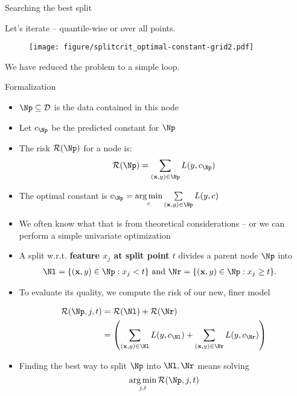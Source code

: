 \documentclass[11pt,compress,t,notes=noshow, xcolor=table]{beamer}
\begin{document}
\begin{vbframe}{Searching the best split}

Let's iterate -- quantile-wise or over all points.
\begin{figure}
\texttt{[image: figure/splitcrit\_optimal-constant-grid2.pdf]} 
\end{figure}

We have reduced the problem to a simple loop.

\end{vbframe}

\begin{vbframe}{Formalization}

\begin{itemize}
\item $\Np \subseteq \D$ is the data contained in this node
\item Let $c_{\Np}$ be the predicted constant for $\Np$ %
\item The risk $\risk(\Np)$ for a node is:
  $$\risk(\Np) = \sum\limits_{(\xv, y) \in \Np} L(y, c_{\Np})$$
\item The optimal constant is $c_{\Np} = \argminlim_c \sum\limits_{(\xv, y) \in \Np} L(y, c)$ 
\item We often know what that is from theoretical considerations -- or we can perform a simple univariate optimization
\end{itemize}

\framebreak

\begin{itemize}
\item A split w.r.t. \textbf{feature $x_j$ at split point $t$} divides a parent node $\Np$ into 
  \begin{align*}
    \Nl &= \{ (\xv, y) \in \Np: x_j < t \} \text{ and } \Nr = \{ (\xv, y) \in \Np: x_j \geq t \}.
  \end{align*}
\item   
  To evaluate its quality, we compute the risk of our new, finer model
  
     \begin{align*}
      \risk(\Np, j, t) &=  \risk(\Nl) +  \risk(\Nr) \\
                  &= \left(\sum\limits_{(\xv,y) \in \Nl} L(y, c_{\Nl}) + \sum\limits_{(\xv,y) \in \Nr} L(y, c_{\Nr})\right)
      \end{align*}
  \item Finding the best way to split $\Np$ into $\Nl, \Nr$ means solving
  $$\argmin_{j, t} \risk(\Np, j, t)$$
\end{itemize}


\end{vbframe}
\end{document}
